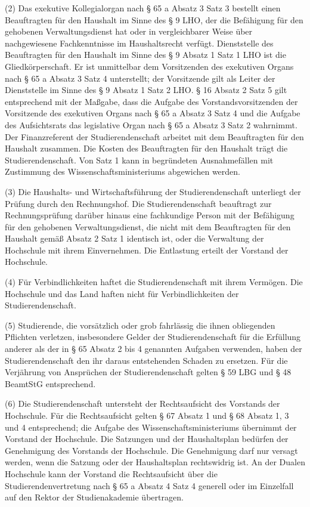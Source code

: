 \documentclass[
10pt,
a4paper,
twoside,								%
titlepage=false,							%
draft=false								%
]{scrartcl}
\begin{document}
(2) Das exekutive Kollegialorgan nach § 65 a Absatz 3 Satz 3 bestellt einen Beauftragten für den Haushalt im Sinne des § 9 LHO, der die Befähigung für den gehobenen Verwaltungsdienst hat oder in vergleichbarer Weise über nachgewiesene Fachkenntnisse im Haushaltsrecht verfügt. Dienststelle des Beauftragten für den Haushalt im Sinne des § 9 Absatz 1 Satz 1 LHO ist die Gliedkörperschaft. Er ist unmittelbar dem Vorsitzenden des exekutiven Organs nach § 65 a Absatz 3 Satz 4 unterstellt; der Vorsitzende gilt als Leiter der Dienststelle im Sinne des § 9 Absatz 1 Satz 2 LHO. § 16 Absatz 2 Satz 5 gilt entsprechend mit der Maßgabe, dass die Aufgabe des Vorstandsvorsitzenden der Vorsitzende des exekutiven Organs nach § 65 a Absatz 3 Satz 4 und die Aufgabe des Aufsichtsrats das legislative Organ nach § 65 a Absatz 3 Satz 2 wahrnimmt. Der Finanzreferent der Studierendenschaft arbeitet mit dem Beauftragten für den Haushalt zusammen. Die Kosten des Beauftragten für den Haushalt trägt die Studierendenschaft. Von Satz 1 kann in begründeten Ausnahmefällen mit Zustimmung des Wissenschaftsministeriums abgewichen werden.

(3) Die Haushalts- und Wirtschaftsführung der Studierendenschaft unterliegt der Prüfung durch den Rechnungshof. Die Studierendenschaft beauftragt zur Rechnungsprüfung darüber hinaus eine fachkundige Person mit der Befähigung für den gehobenen Verwaltungsdienst, die nicht mit dem Beauftragten für den Haushalt gemäß Absatz 2 Satz 1 identisch ist, oder die Verwaltung der Hochschule mit ihrem Einvernehmen. Die Entlastung erteilt der Vorstand der Hochschule.

(4) Für Verbindlichkeiten haftet die Studierendenschaft mit ihrem Vermögen. Die Hochschule und das Land haften nicht für Verbindlichkeiten der Studierendenschaft.

(5) Studierende, die vorsätzlich oder grob fahrlässig die ihnen obliegenden Pflichten verletzen, insbesondere Gelder der Studierendenschaft für die Erfüllung anderer als der in § 65 Absatz 2 bis 4 genannten Aufgaben verwenden, haben der Studierendenschaft den ihr daraus entstehenden Schaden zu ersetzen. Für die Verjährung von Ansprüchen der Studierendenschaft gelten § 59 LBG und § 48 BeamtStG entsprechend.

(6) Die Studierendenschaft untersteht der Rechtsaufsicht des Vorstands der Hochschule. Für die Rechtsaufsicht gelten § 67 Absatz 1 und § 68 Absatz 1, 3 und 4 entsprechend; die Aufgabe des Wissenschaftsministeriums übernimmt der Vorstand der Hochschule. Die Satzungen und der Haushaltsplan bedürfen der Genehmigung des Vorstands der Hochschule. Die Genehmigung darf nur versagt werden, wenn die Satzung oder der Haushaltsplan rechtswidrig ist. An der Dualen Hochschule kann der Vorstand die Rechtsaufsicht über die Studierendenvertretung nach § 65 a Absatz 4 Satz 4 generell oder im Einzelfall auf den Rektor der Studienakademie übertragen.
\end{document}
